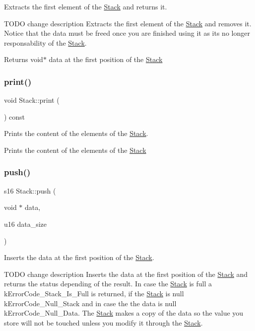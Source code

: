 Extracts the first element of the \hyperlink{class_stack}{Stack} and returns it. 

T\+O\+DO change description Extracts the first element of the \hyperlink{class_stack}{Stack} and removes it. Notice that the data must be freed once you are finished using it as it\textquotesingle{}s no longer responsability of the \hyperlink{class_stack}{Stack}.

\begin{DoxyReturn}{Returns}
void$\ast$ data at the first position of the \hyperlink{class_stack}{Stack} 
\end{DoxyReturn}
\mbox{\label{class_stack_a93cbfa88863494b516670340d01358dd}} 
\subsubsection{\texorpdfstring{print()}{print()}}
{\footnotesize\ttfamily void Stack\+::print (\begin{DoxyParamCaption}{ }\end{DoxyParamCaption}) const}



Prints the content of the elements of the \hyperlink{class_stack}{Stack}. 

Prints the content of the elements of the \hyperlink{class_stack}{Stack} \mbox{\label{class_stack_ace717fade5bd0d805231aa934bb04299}} 
\subsubsection{\texorpdfstring{push()}{push()}}
{\footnotesize\ttfamily s16 Stack\+::push (\begin{DoxyParamCaption}\item[{void $\ast$}]{data,  }\item[{u16}]{data\+\_\+size }\end{DoxyParamCaption})}



Inserts the data at the first position of the \hyperlink{class_stack}{Stack}. 

T\+O\+DO change description Inserts the data at the first position of the \hyperlink{class_stack}{Stack} and returns the status depending of the result. In case the \hyperlink{class_stack}{Stack} is full a k\+Error\+Code\+\_\+\+Stack\+\_\+\+Is\+\_\+\+Full is returned, if the \hyperlink{class_stack}{Stack} is null k\+Error\+Code\+\_\+\+Null\+\_\+\+Stack and in case the the data is null k\+Error\+Code\+\_\+\+Null\+\_\+\+Data. The \hyperlink{class_stack}{Stack} makes a copy of the data so the value you store will not be touched unless you modify it through the \hyperlink{class_stack}{Stack}.

